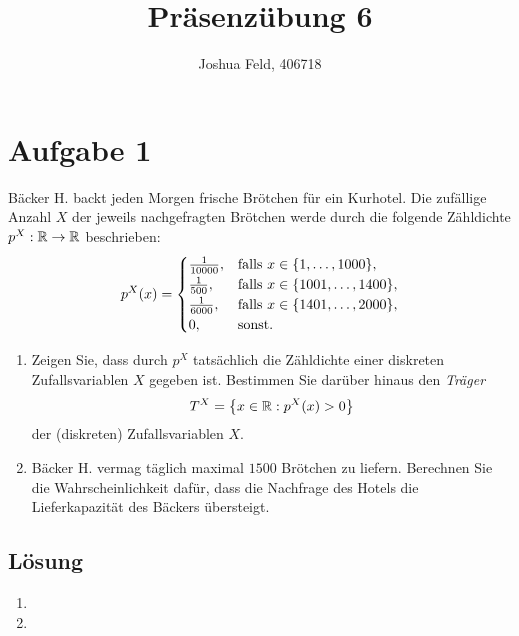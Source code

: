 \documentclass{exercise}
\institute{Institut für Statistik und Wirtschaftsmathematik}
\title{Präsenzübung 6}
\author{Joshua Feld, 406718}
\begin{document}
    \maketitle


    \section*{Aufgabe 1}

    \begin{problem}
        Bäcker H. backt jeden Morgen frische Brötchen für ein Kurhotel.
        Die zufällige Anzahl \(X\) der jeweils nachgefragten Brötchen werde durch die folgende Zähldichte \(p^X: \mathbb{R} \to \mathbb{R}\) beschrieben:
        \[
            p^X\parentheses*{x} = \begin{cases}
                \frac{1}{10000}, & \text{falls }x \in \braces*{1, \ldots, 1000},\\
                \frac{1}{500}, & \text{falls }x \in \braces*{1001, \ldots, 1400},\\
                \frac{1}{6000}, & \text{falls }x \in \braces*{1401, \ldots, 2000},\\
                0, & \text{sonst}.
            \end{cases}
        \]
        \begin{enumerate}
            \item Zeigen Sie, dass durch \(p^X\) tatsächlich die Zähldichte einer diskreten Zufallsvariablen \(X\) gegeben ist.
            Bestimmen Sie darüber hinaus den \emph{Träger}
            \[
                T^X = \braces*{x \in \R : p^X\parentheses*{x} > 0}
            \]
            der (diskreten) Zufallsvariablen \(X\).
            \item Bäcker H. vermag täglich maximal \(1500\) Brötchen zu liefern.
            Berechnen Sie die Wahrscheinlichkeit dafür, dass die Nachfrage des Hotels die Lieferkapazität des Bäckers übersteigt.
        \end{enumerate}
    \end{problem}

    \subsection*{Lösung}
    \begin{enumerate}
        \item
        \item 
    \end{enumerate}
\end{document}
